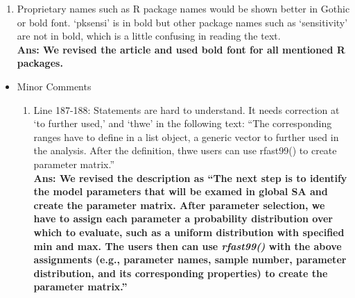 \documentclass[
]{article}
\providecommand{\tightlist}{%
  \setlength{\itemsep}{0pt}\setlength{\parskip}{0pt}}
\begin{document}
\begin{enumerate}
\def\labelenumi{\arabic{enumi}.}
\setcounter{enumi}{1}
\tightlist
\item
  Proprietary names such as R package names would be shown better in
  Gothic or bold font. `pksensi' is in bold but other package names such
  as `sensitivity' are not in bold, which is a little confusing in
  reading the text.\\
  \textbf{Ans: We revised the article and used bold font for all
  mentioned R packages.}
\end{enumerate}

\begin{itemize}
\item
  Minor Comments

  \begin{enumerate}
  \def\labelenumi{\arabic{enumi}.}
  \tightlist
  \item
    Line 187-188: Statements are hard to understand. It needs correction
    at `to further used,' and `thwe' in the following text: ``The
    corresponding ranges have to define in a list object, a generic
    vector to further used in the analysis. After the definition, thwe
    users can use rfast99() to create parameter matrix.''\\
    \textbf{Ans: We revised the description as ``The next step is to
    identify the model parameters that will be examed in global SA and
    create the parameter matrix. After parameter selection, we have to
    assign each parameter a probability distribution over which to
    evaluate, such as a uniform distribution with specified min and max.
    The users then can use \textit{\textbf{rfast99()}} with the above
    assignments (e.g., parameter names, sample number, parameter
    distribution, and its corresponding properties) to create the
    parameter matrix.''}
  \end{enumerate}
\end{itemize}
\end{document}
